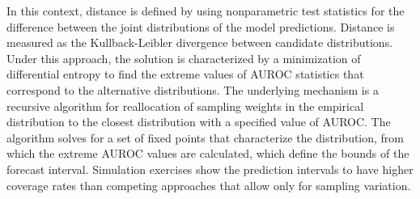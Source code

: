 In this context, distance is defined by using nonparametric test statistics for the difference between the joint distributions of the model predictions.
%
Distance is measured as the Kullback-Leibler divergence between candidate distributions. 
Under this approach, the solution is characterized by a minimization of differential entropy to find the extreme values of AUROC statistics that correspond to the alternative distributions. 
The underlying mechanism is a recursive algorithm for reallocation of sampling weights in the empirical distribution to the closest distribution with a specified value of AUROC.
The algorithm solves for a set of fixed points that characterize the distribution,
from which the extreme AUROC values are calculated, which define the bounds of the forecast interval.
%
%
%
Simulation exercises show the prediction intervals to have higher coverage rates than competing approaches that allow only for sampling variation.



%
%
%

